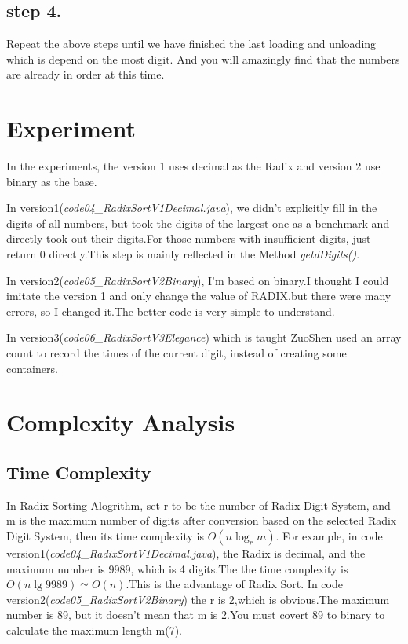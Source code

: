 \documentclass[11pt]{article}
\begin{document}
    \subsection{step 4.}
    Repeat the above steps until we have finished the last loading and unloading which is depend on the most digit.
    And you will amazingly find that the numbers are already in order at this time.

    \section{Experiment}
    In the experiments, the version 1 uses decimal as the Radix and version 2 use binary as the base.\par
    \noindent In version1(\emph{code04\_RadixSortV1Decimal.java}), we didn't explicitly fill in the digits of all numbers,
    but took the digits of the largest one as a benchmark and directly took out their digits.For those numbers with
    insufficient digits, just return 0 directly.This step is mainly reflected in the Method \emph{getdDigits()}.

    \noindent In version2(\emph{code05\_RadixSortV2Binary}), I'm based on binary.I thought I could imitate the version 1 and
    only change the value of RADIX,but there were many errors, so I changed it.The better code is very simple to understand.

    \noindent In version3(\emph{code06\_RadixSortV3Elegance}) which is taught ZuoShen used an array count to record the times
    of the current digit, instead of creating some containers.

    \section{Complexity Analysis}
    \subsection{Time Complexity}
    In Radix Sorting Alogrithm, set r to be the number of Radix Digit System, and m is the maximum number of digits after conversion
    based on the selected Radix Digit System, then its time complexity is $O(n\log_rm)$.
    For example, in code version1(\emph{code04\_RadixSortV1Decimal.java}), the Radix is decimal, and the maximum number is 9989,
    which is 4 digits.The the time complexity is $O(n\lg9989) \simeq O(n)$.This is the advantage of Radix Sort.
    In code version2(\emph{code05\_RadixSortV2Binary}) the r is 2,which is obvious.The maximum number is 89, but it doesn't mean
    that m is 2.You must covert 89 to binary to calculate the maximum length m(7).
\end{document}
